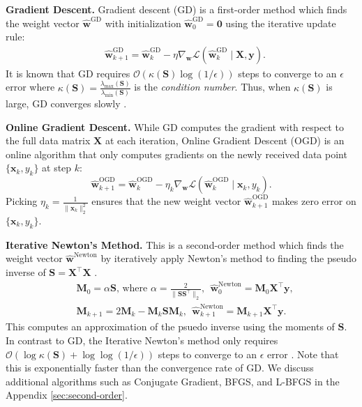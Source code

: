 \documentclass[11pt]{article}
\theoremstyle{plain}
\theoremstyle{definition}
\theoremstyle{remark}
\newcommand{\zero}{\boldsymbol{0}}
\renewcommand{\^}[1]{^{(#1)}}
\newcommand{\bx}{\boldsymbol{x}}
\newcommand{\bX}{\boldsymbol{X}}
\newcommand{\bM}{\boldsymbol{M}}
\newcommand{\by}{\boldsymbol{y}}
\newcommand{\bS}{\boldsymbol{S}}
\newcommand{\bw}{\boldsymbol{w}}
\newcommand{\newton}{Iterative Newton}
\renewcommand{\paragraph}[1]{\vspace{1mm}\noindent\textbf{#1}}
\begin{document}
\paragraph{Gradient Descent.}  Gradient descent (GD) is a first-order method which finds the weight vector $\hat{\bw}^\mathrm{GD}$ with initialization $\hat{\bw}^\mathrm{GD}_0 = \zero$ using the iterative update rule:
\begin{equation}
\begin{aligned}
    & \hat{\bw}^\mathrm{GD}_{k+1} = \hat{\bw}^\mathrm{GD}_{k} - \eta \nabla_{\bw} \mathcal L(\hat{\bw}^\mathrm{GD}_{k} \mid \bX, \by).
\end{aligned}
\end{equation}
It is known that GD requires $\mathcal O\left(\kappa(\bS) \log(1/\epsilon)\right)$  steps to converge to an $\epsilon$ error where $\kappa(\bS) = \frac{\lambda_{\max}(\bS)}{\lambda_{\min}(\bS)}$ is the \textit{condition number}. Thus, when $\kappa(\bS)$ is large, GD converges slowly \citep{boyd2004convex}. 

\paragraph{Online Gradient Descent.}
While GD computes the gradient with respect to the full data matrix $\bX$ at each iteration, Online Gradient Descent (OGD) is an online algorithm that only computes gradients on the newly received data point $\{\bx_k, y_k\}$ at step $k$:
\begin{equation}
    \hat{\bw}^\mathrm{OGD}_{k+1} = \hat{\bw}^\mathrm{OGD}_{k} - \eta_k \nabla_{\bw} \mathcal L(\hat{\bw}^\mathrm{OGD}_{k} \mid \bx_k, y_k).
\end{equation}
Picking $\eta_k = \frac{1}{\|\bx_k\|_2^2}$ ensures that the new weight vector $\hat{\bw}^\mathrm{OGD}_{k+1}$ makes zero error on $\{\bx_k, y_k\}$. 

\paragraph{\newton's Method.} This is a second-order method which finds the weight vector $ \hat{\bw}^\mathrm{Newton}$ by iteratively apply Newton's method to finding the pseudo inverse of $\bS = \bX^\top \bX$ \citep{schulz1933inverse,adi1965ai}. 
\begin{equation}
    \begin{aligned}
        &\bM_0 = \alpha \bS \textrm{, where } \alpha = \frac{2}{\|\bS \bS^\top\|_2 }, ~~ \hat{\bw}^\mathrm{Newton}_0 = \bM_0 \bX^\top \by, \\
        & \bM_{k+1} = 2 \bM_{k} - \bM_k \bS \bM_k, ~~ \hat{\bw}^\mathrm{Newton}_{k+1} =  \bM_{k+1}  \bX^\top \by. 
    \end{aligned}
\end{equation}
This computes an approximation of the  psuedo inverse using the moments of $\bS$. In contrast to GD, the \newton's method only requires $\mathcal O(\log \kappa(\bS) + \log \log (1/\epsilon))$ steps to converge to an $\epsilon$ error \citep{soderstrom1974onp,Pan1991AnIN}. Note that this is exponentially faster than the convergence rate of GD. 
We discuss additional algorithms such as Conjugate Gradient, BFGS, and L-BFGS in the Appendix \ref{sec:second-order}.
\end{document}
